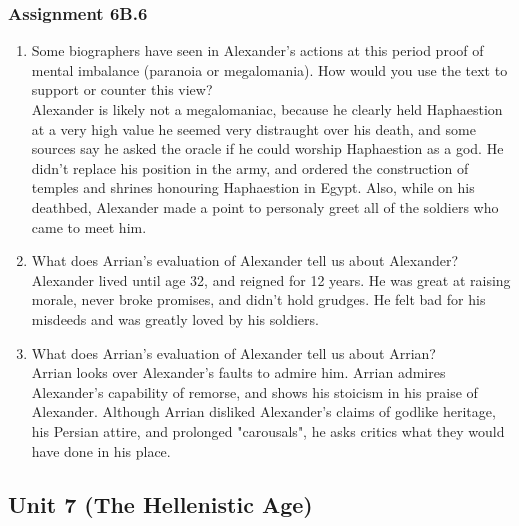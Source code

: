 \documentclass{article}
\begin{document}
\subsubsection*{Assignment 6B.6}
\begin{enumerate}
  \item Some biographers have seen in Alexander’s actions at this period proof of mental
  imbalance (paranoia or megalomania). How would you use the text to support or counter this view? \\
Alexander is likely not a megalomaniac, because he clearly held Haphaestion at a very high value
he seemed very distraught over his death, and some sources say he asked the oracle if he could
worship Haphaestion as a god. He didn't replace his position in the army, and ordered the construction
of temples and shrines honouring Haphaestion in Egypt. Also, while on his deathbed, Alexander
made a point to personaly greet all of the soldiers who came to meet him.
  \item What does Arrian’s evaluation of Alexander tell us about Alexander? \\
  Alexander lived until age 32, and reigned for 12 years. He was great at raising morale, never
  broke promises, and didn't hold grudges. He felt bad for his misdeeds and was greatly loved
  by his soldiers.
  \item What does Arrian’s evaluation of Alexander tell us about Arrian? \\
  Arrian looks over Alexander's faults to admire him. Arrian admires Alexander's capability of
  remorse, and shows his stoicism in his praise of Alexander. Although Arrian disliked Alexander's
  claims of godlike heritage, his Persian attire, and prolonged "carousals", he asks critics what
  they would have done in his place.
\end{enumerate}
\subsection*{Unit 7 (The Hellenistic Age)}
\end{document}
